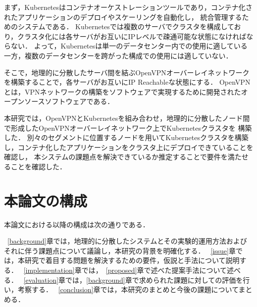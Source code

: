 まず，Kubernetesはコンテナオーケストレーションツールであり，コンテナ化されたアプリケーションのデプロイやスケーリングを自動化し，
統合管理するためのシステムである．
Kubernetesでは複数のサーバでクラスタを構成しており，クラスタ化には各サーバがお互いにIPレベルで疎通可能な状態になければならない．
よって，Kubernetesは単一のデータセンター内での使用に適している一方，複数のデータセンターを跨がった構成での使用には適していない．

そこで，地理的に分散したサーバ間を結ぶOpenVPNオーバーレイネットワークを構築することで，各サーバがお互いにIP Reachableな状態にする．
OpenVPNとは，VPNネットワークの構築をソフトウェアで実現するために開発されたオープンソースソフトウェアである．

本研究では，OpenVPNとKubernetesを組み合わせ，地理的に分散したノード間で形成したOpenVPNオーバーレイネットワーク上でKubernetesクラスタを
構築した．
別々のセグメントに位置するノードを用いてKubernetesクラスタを構築し，コンテナ化したアプリケーションをクラスタ上にデプロイできていることを確認し，
本システムの課題点を解決できているか推定することで要件を満たせることを確認した．

\section{本論文の構成}
\label{introduction:structure}

本論文における以降の構成は次の通りである．

~\ref{background}章では，地理的に分散したシステムとその実験的運用方法およびそれに伴う課題点について議論し，本研究の背景を明確化する．
~\ref{issue}章では，本研究で着目する問題を解決するための要件，仮説と手法について説明する．
~\ref{implementation}章では，~\ref{proposed}章で述べた提案手法について述べる．
~\ref{evaluation}章では，\ref{background}章で求められた課題に対しての評価を行い，考察する．
~\ref{conclusion}章では，本研究のまとめと今後の課題についてまとめる．

